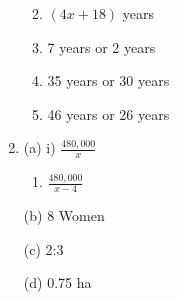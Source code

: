\documentclass[
  a4paperpaper,
]{scrbook}
\providecommand{\tightlist}{%
  \setlength{\itemsep}{0pt}\setlength{\parskip}{0pt}}\usepackage{longtable,booktabs,array}
\begin{document}
\begin{tcolorbox}
\begin{enumerate}
  \begin{enumerate}
  \def\labelenumii{\roman{enumii})}
  \setcounter{enumii}{1}
  \item
    \((4x+18)\) years
  \item
    7 years or 2 years
  \item
    35 years or 30 years
  \item
    46 years or 26 years
  \end{enumerate}
\item
  (a) i) \(\frac{480,000}{x}\)

  \begin{enumerate}
  \def\labelenumii{\roman{enumii})}
  \setcounter{enumii}{1}
  \tightlist
  \item
    \(\frac{480,000}{x-4}\)
  \end{enumerate}

  (b) 8 Women

  (c) 2:3

  (d) 0.75 ha
\end{enumerate}

\end{tcolorbox}
\end{document}
